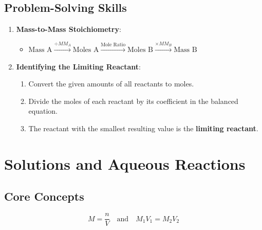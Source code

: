\documentclass[11pt]{article}
\begin{document}
\subsection{Problem-Solving Skills}
\begin{enumerate}
    \item \textbf{Mass-to-Mass Stoichiometry}:
    \begin{itemize}
        \item $\text{Mass A} \xrightarrow{\div MM_A} \text{Moles A} \xrightarrow{\text{Mole Ratio}} \text{Moles B} \xrightarrow{\times MM_B} \text{Mass B}$
    \end{itemize}

    \item \textbf{Identifying the Limiting Reactant}:
    \begin{enumerate}[label=\alph*)]
        \item Convert the given amounts of all reactants to moles.
        \item Divide the moles of each reactant by its coefficient in the balanced equation.
        \item The reactant with the smallest resulting value is the \textbf{limiting reactant}.
    \end{enumerate}
\end{enumerate}

\newpage

\section{Solutions and Aqueous Reactions}

\subsection{Core Concepts}
\begin{tcolorbox}[memorize, title=Concentration and Dilution (Must Memorize)]
    \[ M = \frac{n}{V} \quad \text{and} \quad M_1V_1 = M_2V_2 \]
\end{tcolorbox}
\end{document}
